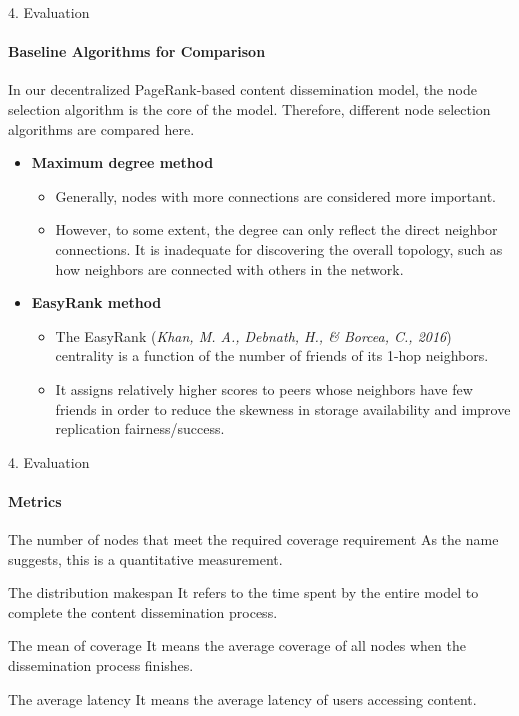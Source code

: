 \documentclass{beamer}		%
\begin{document}
\begin{frame}{4. Evaluation}
\framesubtitle{Baseline Algorithms for Comparison}
In our decentralized PageRank-based content dissemination model, the node selection algorithm is the core of the model. Therefore, different node selection algorithms are compared here. 
\begin{itemize}
    \item \textbf{Maximum degree method}
    \begin{itemize}
        \item Generally, nodes with more connections are considered more important. 
        \item However, to some extent, the degree can only reflect the direct neighbor connections. It is inadequate for discovering the overall topology, such as how neighbors are connected with others in the network.
    \end{itemize}
    \item \textbf{EasyRank method}
    \begin{itemize}
        \item The EasyRank (\textit{Khan, M. A., Debnath, H., \& Borcea, C., 2016}) centrality is a function of the number of friends of its 1-hop neighbors.
        \item It assigns relatively higher scores to peers whose neighbors have few friends in order to reduce the skewness in storage availability and improve replication fairness/success.
    \end{itemize}
\end{itemize}
\end{frame}

\begin{frame}{4. Evaluation}
\framesubtitle{Metrics}
\begin{block}{The number of nodes that meet the required coverage requirement}
As the name suggests, this is a quantitative measurement.
\end{block}
\begin{block}{The distribution makespan}
It refers to the time spent by the entire model to complete the content dissemination process.
\end{block}
\begin{block}{The mean of coverage}
It means the average coverage of all nodes when the dissemination process finishes.
\end{block}
\begin{block}{The average latency}
It means the average latency of users accessing content.
\end{block}
\end{frame}
\end{document}
